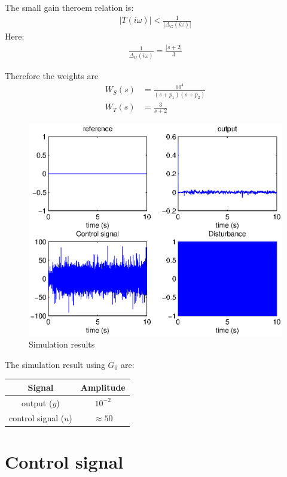 \documentclass[a4paper,11pt]{article}
\begin{document}
    The small gain theroem relation is:
    \begin{align*}
        |T(i\omega)| < \frac{1}{|\Delta_G(i\omega)|}
    \end{align*}
    Here:
    \begin{align*}
        \frac{1}{\Delta_G(i\omega)} = \frac{|s+2|}{3}
    \end{align*}

	Therefore the weights are
	\begin{align*}
        W_S(s) & = \frac{10^{4}}{(s+p_1)(s+p_2)}  \\
        W_T(s) & = \frac{3}{s+2}
	\end{align*}

    \begin{figure}[h!b]
        \centering
        \includegraphics[width=.75\columnwidth]{fig/figure2.eps}
        \caption{Simulation results}
    \end{figure}

    The simulation result using $G_0$ are:
    
    \begin{center}
        \begin{tabular}{|c|c|}
        \hline
        \textbf{Signal} & \textbf{Amplitude} \\
        \hline
        output ($y$) & $10^{-2}$ \\
        \hline
        control signal ($u$) & $\approx 50$ \\
        \hline
        \end{tabular}
    \end{center}

	\section*{Control signal}
\end{document}
